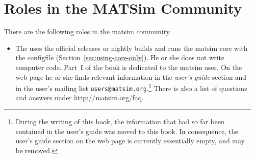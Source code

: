 \section{Roles in the MATSim Community}
\label{sec:roles}
There are the following roles in the \gls{matsim} community.
%
\begin{itemize}\styleItemize
\item The  uses the official releases or nightly builds and runs the \gls{matsim} core with the \gls{configfile} (Section~\ref{sec:using-core-only}). He or she does not write computer code. Part~I of the book is dedicated to the \gls{matsim} user. On the web page he or she finds relevant information in the \emph{user's guide} section and in the user's mailing list \lstinline|users@matsim.org|.\footnote{%
%
During the writing of this book, the information that had so far been contained in the user's guide was moved to this book.  In consequence, the user's guide section on the web page is currently essentially empty, and may be removed.
%
} There is also a list of questions and answers under \url{http://matsim.org/faq}.


\end{itemize}
